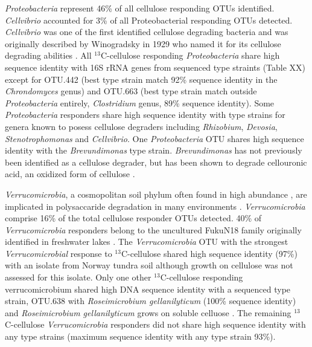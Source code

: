 \textit{Proteobacteria} represent 46\% of all cellulose responding OTUs
identified. \textit{Cellvibrio} accounted for 3\% of all Proteobacterial
responding OTUs detected. \textit{Cellvibrio} was one of the first identified
cellulose degrading bacteria and was originally described by Winogradsky in
1929 who named it for its cellulose degrading abilities
\cite{boone2001bergeys}. All $^{13}$C-cellulose responding
\textit{Proteobacteria} share high sequence identity with 16S rRNA genes from
sequenced type straints (Table XX) except for OTU.442 (best type strain match
92\% sequence identity in the \textit{Chrondomyces} genus) and OTU.663 (best
type strain match outside \textit{Proteobacteria} entirely,
\textit{Clostridium} genus, 89\% sequence identity). Some
\textit{Proteobacteria} responders share high sequence identity with type
strains for genera known to posess cellulose degraders including
\textit{Rhizobium}, \textit{Devosia}, \textit{Stenotrophomonas} and
\textit{Cellvibrio}. One \textit{Proteobacteria} OTU shares high sequence
identity with the \textit{Brevundimonas} type strain. \textit{Brevundimonas}
has not previously been identified as a cellulose degrader, but has been shown
to degrade cellouronic acid, an oxidized form of cellulose
\cite{Tavernier_2008}.

\textit{Verrucomicrobia}, a cosmopolitan soil phylum often found in high
abundance \cite{Fierer_2013}, are implicated in polysaccaride degradation in
many environments \cite{Fierer_2013,Herlemann_2013,10543821}.
\textit{Verrucomicrobia} comprise 16\% of the total cellulose responder OTUs
detected. 40\% of \textit{Verrucomicrobia} responders belong to the uncultured
FukuN18 family originally identified in freshwater lakes \cite{Parveen_2013}.
The \textit{Verrucomicrobia} OTU with the strongest \textit{Verrucomicrobial}
response to $^{13}$C-cellulose shared high sequence identity (97\%) with an
isolate from Norway tundra soil \cite{Jiang_2011} although growth on cellulose
was not assessed for this isolate. Only one other $^{13}$C-cellulose responding
verrucomicrobium shared high DNA sequence identity with a sequenced type
strain, OTU.638 with \textit{Roseimicrobium gellanilyticum} (100\% sequence
identity) and \textit{Roseimicrobium gellanilyticum} grows on soluble celluose
\cite{Otsuka_2012}. The remaining $^{13}$C-cellulose \textit{Verrucomicrobia}
responders did not share high sequence identity with any type strains (maximum
sequence identity with any type strain 93\%). 

